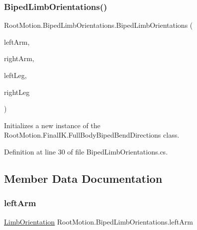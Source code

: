 \subsubsection{\texorpdfstring{Biped\+Limb\+Orientations()}{BipedLimbOrientations()}}
{\footnotesize\ttfamily Root\+Motion.\+Biped\+Limb\+Orientations.\+Biped\+Limb\+Orientations (\begin{DoxyParamCaption}\item[{\mbox{\hyperlink{class_root_motion_1_1_biped_limb_orientations_1_1_limb_orientation}{Limb\+Orientation}}}]{left\+Arm,  }\item[{\mbox{\hyperlink{class_root_motion_1_1_biped_limb_orientations_1_1_limb_orientation}{Limb\+Orientation}}}]{right\+Arm,  }\item[{\mbox{\hyperlink{class_root_motion_1_1_biped_limb_orientations_1_1_limb_orientation}{Limb\+Orientation}}}]{left\+Leg,  }\item[{\mbox{\hyperlink{class_root_motion_1_1_biped_limb_orientations_1_1_limb_orientation}{Limb\+Orientation}}}]{right\+Leg }\end{DoxyParamCaption})}



Initializes a new instance of the Root\+Motion.\+Final\+I\+K.\+Full\+Body\+Biped\+Bend\+Directions class. 



Definition at line 30 of file Biped\+Limb\+Orientations.\+cs.



\subsection{Member Data Documentation}
\mbox{\label{class_root_motion_1_1_biped_limb_orientations_a7c660460988757efd2d8e47292db7e51}} 
\subsubsection{\texorpdfstring{left\+Arm}{leftArm}}
{\footnotesize\ttfamily \mbox{\hyperlink{class_root_motion_1_1_biped_limb_orientations_1_1_limb_orientation}{Limb\+Orientation}} Root\+Motion.\+Biped\+Limb\+Orientations.\+left\+Arm}




